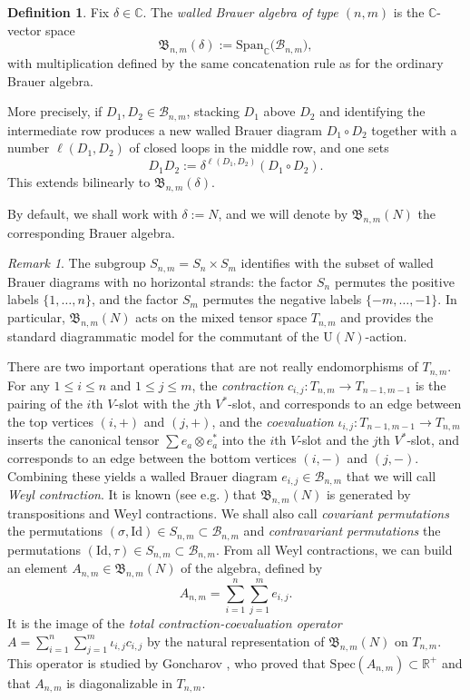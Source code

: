 \documentclass[11pt,a4paper,reqno]{article}
\theoremstyle{definition}
\newtheorem{definition}[theorem]{Definition}
\theoremstyle{remark}
\newtheorem{remark}[theorem]{Remark}
\newcommand\U{{\mathrm U}}
\newcommand\Id{\mathrm{Id}}
\newcommand\R{\mathbb{R}}
\newcommand\C{\mathbb{C}}
\newcommand\B{{\mathcal{B}}}
\newcommand\Br{{\mathfrak{B}}}
\newcommand\Span{{\mathrm{Span}}}
\newcommand\Spec{{\mathrm{Spec}}}
\begin{document}
\begin{definition}
Fix $\delta\in\C$. The \emph{walled Brauer algebra of type $(n,m)$} is the $\C$-vector space
\[
\Br_{n,m}(\delta):=\Span_\C\big(\mathcal \B_{n,m}\big),
\]
with multiplication defined by the same concatenation rule as for the ordinary Brauer algebra.

More precisely, if $D_1,D_2\in\mathcal \B_{n,m}$, stacking $D_1$ above $D_2$ and identifying the intermediate row produces a new walled Brauer diagram $D_1\circ D_2$ together with a number $\ell(D_1,D_2)$ of closed loops in
the middle row, and one sets
\[
D_1D_2:=\delta^{\ell(D_1,D_2)}(D_1\circ D_2).
\]
This extends bilinearly to $\Br_{n,m}(\delta)$.
\end{definition}

By default, we shall work with $\delta:=N$, and we will denote by $\Br_{n,m}(N)$ the corresponding Brauer algebra.

\begin{remark}
The subgroup $S_{n,m}=S_n\times S_m$ identifies with the subset of walled Brauer diagrams with no horizontal strands: the factor $S_n$ permutes the positive labels $\{1,\dots,n\}$, and the factor $S_m$ permutes the negative labels
$\{-m,\dots,-1\}$. In particular, $\Br_{n,m}(N)$ acts on the mixed tensor space $T_{n,m}$ and provides the standard diagrammatic model for the commutant of the $\U(N)$-action.
\end{remark}

There are two important operations that are not really endomorphisms of $T_{n,m}$. For any $1\leq i\leq n$ and $1\leq j\leq m$, the \emph{contraction} $c_{i,j}:T_{n,m}\to T_{n-1,m-1}$ is the pairing of the $i$th $V$-slot with the $j$th $V^*$-slot, and corresponds to an edge between the top vertices $(i,+)$ and $(j,+)$, and the \emph{coevaluation} $\iota_{i,j}:T_{n-1,m-1}\to T_{n,m}$ inserts the canonical tensor $\sum e_a\otimes e_a^*$ into the $i$th $V$-slot and the $j$th $V^*$-slot, and corresponds to an edge between the bottom vertices $(i,-)$ and $(j,-)$. Combining these yields a walled Brauer diagram $e_{i,j}\in\B_{n,m}$ that we will call \emph{Weyl contraction}. It is known (see e.g. \cite{Hal96}) that $\Br_{n,m}(N)$ is generated by transpositions and Weyl contractions. We shall also call \emph{covariant permutations} the permutations $(\sigma,\Id)\in S_{n,m}\subset\B_{n,m}$ and \emph{contravariant permutations} the permutations $(\Id,\tau)\in S_{n,m}\subset\B_{n,m}$. From all Weyl contractions, we can build an element $A_{n,m}\in\Br_{n,m}(N)$ of the algebra, defined by
\begin{equation}
A_{n,m}=\sum_{i=1}^n\sum_{j=1}^me_{i,j}.
\end{equation}
It is the image of the \emph{total contraction-coevaluation operator} $A=\sum_{i=1}^n\sum_{j=1}^m\iota_{i,j}c_{i,j}$ by the natural representation of $\Br_{n,m}(N)$ on $T_{n,m}$. This operator is studied by Goncharov \cite{Gon25}, who proved that $\Spec(A_{n,m})\subset\R^+$ and that $A_{n,m}$ is diagonalizable in $T_{n,m}$.
\end{document}
